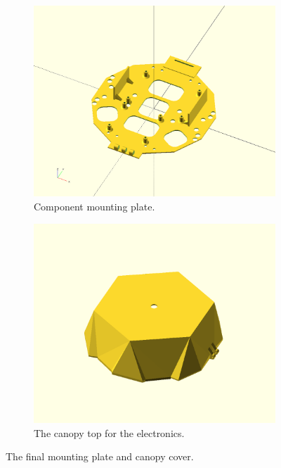 \begin{figure}
    \begin{subfigure}[b]{0.48\textwidth}
        \centering
        \includegraphics[width=\textwidth]{images/component_mounting_plate.png}
        \caption{Component mounting plate.}
        \label{fig:component_mounting_plate}
    \end{subfigure}
    \begin{subfigure}[b]{0.48\textwidth}
        \centering
        \includegraphics[width=\textwidth]{images/canopy.png}
        \caption{The canopy top for the electronics.}
        \label{fig:canopy}
    \end{subfigure}
    \caption{The final mounting plate and canopy cover.}
    \label{fig:mounting}
\end{figure}